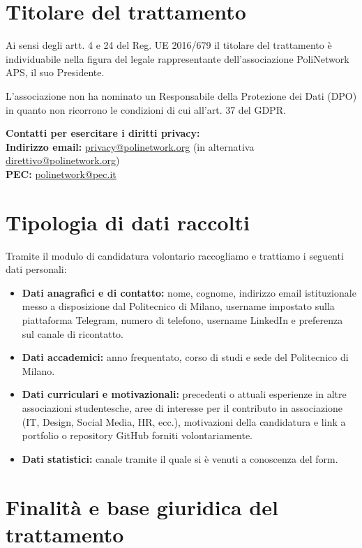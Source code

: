 \documentclass[legal]{polinetwork}
\begin{document}
\pnMakeHeader

\section{Titolare del trattamento}

Ai sensi degli artt. 4 e 24 del Reg. UE 2016/679 il titolare del trattamento è individuabile nella figura del legale rappresentante dell'associazione PoliNetwork APS, il suo Presidente.

L'associazione non ha nominato un Responsabile della Protezione dei Dati (DPO) in quanto non ricorrono le condizioni di cui all'art. 37 del GDPR.

\textbf{Contatti per esercitare i diritti privacy:} \\
\textbf{Indirizzo email:} \href{mailto:privacy@polinetwork.org}{privacy@polinetwork.org} (in alternativa \href{mailto:direttivo@polinetwork.org}{direttivo@polinetwork.org}) \\
\textbf{PEC:} \href{mailto:polinetwork@pec.it}{polinetwork@pec.it}

\section{Tipologia di dati raccolti}

Tramite il modulo di candidatura volontario raccogliamo e trattiamo i seguenti dati personali:
\begin{itemize}
	\item \textbf{Dati anagrafici e di contatto:} nome, cognome, indirizzo email istituzionale messo a disposizione dal Politecnico di Milano, username impostato sulla piattaforma Telegram, numero di telefono, username LinkedIn e preferenza sul canale di ricontatto.
	\item \textbf{Dati accademici:} anno frequentato, corso di studi e sede del Politecnico di Milano.
	\item \textbf{Dati curriculari e motivazionali:} precedenti o attuali esperienze in altre associazioni studentesche, aree di interesse per il contributo in associazione (IT, Design, Social Media, HR, ecc.), motivazioni della candidatura e link a portfolio o repository GitHub forniti volontariamente.
	\item \textbf{Dati statistici:} canale tramite il quale si è venuti a conoscenza del form.
\end{itemize}

\section{Finalità e base giuridica del trattamento}
\end{document}
